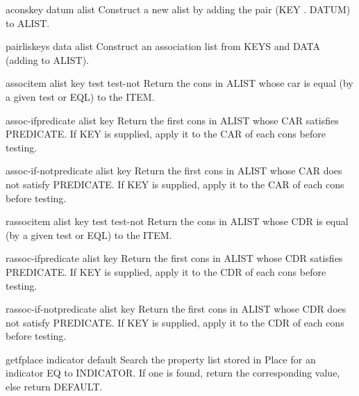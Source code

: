 \documentclass[10pt,english]{book}
\begin{document}
\begin{function}{acons}{key datum alist}
  Construct a new alist by adding the pair (KEY . DATUM) to ALIST.
\end{function}

\begin{function}{pairlis}{keys data \op alist}
  Construct an association list from KEYS and DATA (adding to ALIST).
\end{function}

\begin{function}{assoc}{item alist \key key test test-not}
  Return the cons in ALIST whose car is equal (by a given test or EQL) to
   the ITEM.
\end{function}

\begin{function}{assoc-if}{predicate alist \key key}
  Return the first cons in ALIST whose CAR satisfies PREDICATE. If
   KEY is supplied, apply it to the CAR of each cons before testing.
\end{function}

\begin{function}{assoc-if-not}{predicate alist \key key}
  Return the first cons in ALIST whose CAR does not satisfy PREDICATE.
  If KEY is supplied, apply it to the CAR of each cons before testing.
\end{function}

\begin{function}{rassoc}{item alist \key key test test-not}
  Return the cons in ALIST whose CDR is equal (by a given test or EQL) to
   the ITEM.
\end{function}

\begin{function}{rassoc-if}{predicate alist \key key}
  Return the first cons in ALIST whose CDR satisfies PREDICATE. If KEY
  is supplied, apply it to the CDR of each cons before testing.
\end{function}

\begin{function}{rassoc-if-not}{predicate alist \key key}
  Return the first cons in ALIST whose CDR does not satisfy PREDICATE.
  If KEY is supplied, apply it to the CDR of each cons before testing.
\end{function}

\begin{accessor}{getf}{place indicator \op default}
  Search the property list stored in Place for an indicator EQ to INDICATOR.
  If one is found, return the corresponding value, else return DEFAULT.
\end{accessor}
\end{document}
